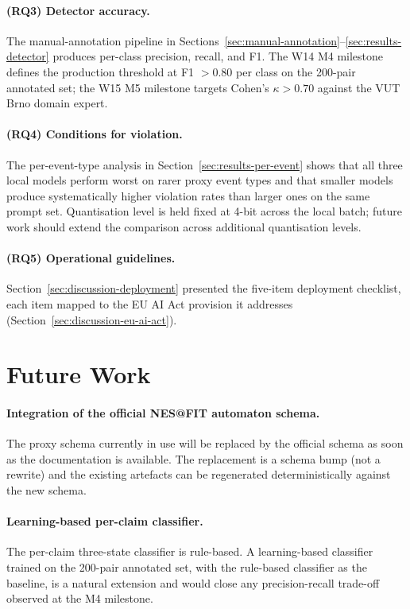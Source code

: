 \paragraph{(RQ3) Detector accuracy.}
The manual-annotation pipeline in
Sections~\ref{sec:manual-annotation}--\ref{sec:results-detector}
produces per-class precision, recall, and F1. The W14 M4 milestone
defines the production threshold at F1 $> 0.80$ per class on the 200-pair
annotated set; the W15 M5 milestone targets Cohen's $\kappa > 0.70$
against the VUT Brno domain expert.

\paragraph{(RQ4) Conditions for violation.}
The per-event-type analysis in Section~\ref{sec:results-per-event} shows
that all three local models perform worst on rarer proxy event types and
that smaller models produce systematically higher violation rates than
larger ones on the same prompt set. Quantisation level is held fixed at
4-bit across the local batch; future work should extend the comparison
across additional quantisation levels.

\paragraph{(RQ5) Operational guidelines.}
Section~\ref{sec:discussion-deployment} presented the five-item
deployment checklist, each item mapped to the EU AI Act provision it
addresses (Section~\ref{sec:discussion-eu-ai-act}).

\section{Future Work}
\label{sec:conclusion-future}

\paragraph{Integration of the official NES@FIT automaton schema.}
The proxy schema currently in use will be replaced by the official
schema as soon as the documentation is available. The replacement is a
schema bump (not a rewrite) and the existing artefacts can be regenerated
deterministically against the new schema.

\paragraph{Learning-based per-claim classifier.}
The per-claim three-state classifier is rule-based. A learning-based
classifier trained on the 200-pair annotated set, with the rule-based
classifier as the baseline, is a natural extension and would close any
precision-recall trade-off observed at the M4 milestone.

